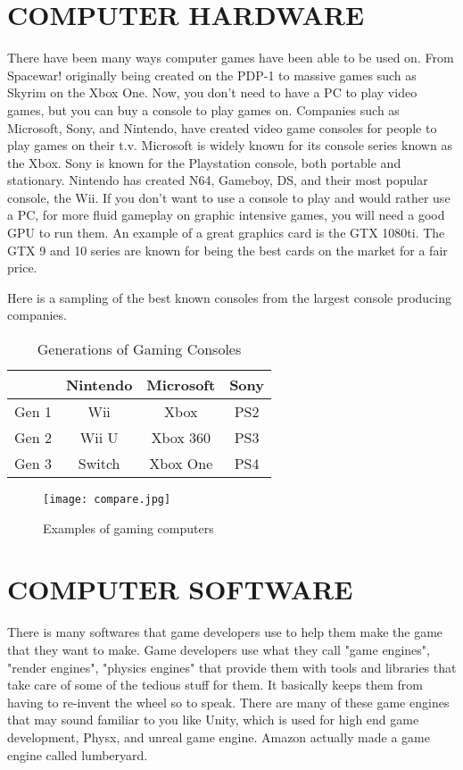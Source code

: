 \documentclass[letterpaper, 10 pt, conference]{IEEEconf}
\begin{document}
\section{COMPUTER HARDWARE}

There have been many ways computer games have been able
to be used on. From Spacewar! originally being created on the
PDP-1 to massive games such as Skyrim on the Xbox One. 
Now, you don't need to have a PC to play video games, but 
you can buy a console to play games on. Companies such as
Microsoft, Sony, and Nintendo, have created video game
consoles for people to play games on their t.v. Microsoft
is widely known for its console series known as the Xbox.
Sony is known for the Playstation console, both portable
and stationary. Nintendo has created N64, Gameboy,
DS, and their most popular console, the Wii. If you don't
want to use a console to play and would rather use a PC, for
more fluid gameplay on graphic intensive games, you will need
a good GPU to run them. An example of a great graphics
card is the GTX 1080ti. The GTX 9 and 10 series are known
for being the best cards on the market for a fair price.

Here is a sampling of the best known consoles from the 
largest console producing companies.
\begin{table}[h!]
\begin{center}
\begin{tabular}{||c | c | c | c||} 
\hline
  & Nintendo & Microsoft & Sony \\ [0.5ex]
\hline\hline
Gen 1 & Wii & Xbox & PS2 \\ 
\hline
Gen 2 & Wii U & Xbox 360 & PS3 \\
\hline
Gen 3 & Switch & Xbox One & PS4 \\
\hline
\end{tabular}
\caption{Generations of Gaming Consoles}
\label{tbl:example}
\end{center}
\end{table}

\begin{figure}[h!]
\centering
\texttt{[image: compare.jpg]}
\caption{Examples of gaming computers}
\label{fig:example}
\end{figure}

\section{COMPUTER SOFTWARE}

There is many softwares that game developers use to help 
them make the game that they want to make. Game developers 
use what they call "game engines", "render engines", "physics 
engines" that provide them with tools and libraries that take care
of some of the tedious stuff for them. It basically keeps them
from having to re-invent the wheel so to speak. There are many 
of these game engines that may sound familiar to you like Unity, 
which is used for high end game development, Physx, and unreal 
game engine. Amazon actually made a game engine called lumberyard.
\end{document}
